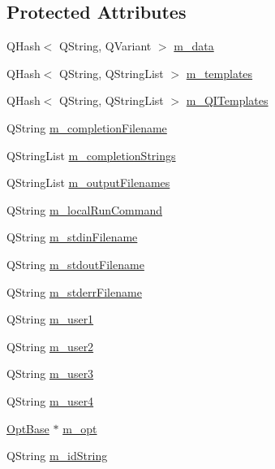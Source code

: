 \subsection*{Protected Attributes}
\begin{DoxyCompactItemize}
\item 
Q\-Hash$<$ Q\-String, Q\-Variant $>$ \hyperlink{classGlobalSearch_1_1Optimizer_a5cf732e34a6eaa4a7b1781d23e6e1c6e}{m\-\_\-data}
\item 
Q\-Hash$<$ Q\-String, Q\-String\-List $>$ \hyperlink{classGlobalSearch_1_1Optimizer_aa5892c64826b7cc7a2baa092efc8c66d}{m\-\_\-templates}
\item 
Q\-Hash$<$ Q\-String, Q\-String\-List $>$ \hyperlink{classGlobalSearch_1_1Optimizer_ac23d5114bf09b816666351868d49d1f8}{m\-\_\-\-Q\-I\-Templates}
\item 
Q\-String \hyperlink{classGlobalSearch_1_1Optimizer_a5e7a476823bc2d4b63939a9ada4f8ed0}{m\-\_\-completion\-Filename}
\item 
Q\-String\-List \hyperlink{classGlobalSearch_1_1Optimizer_a65ee33ee8778c366e8b197e75ae8e674}{m\-\_\-completion\-Strings}
\item 
Q\-String\-List \hyperlink{classGlobalSearch_1_1Optimizer_a28a8bf74bf7bdf00d453890796574c7d}{m\-\_\-output\-Filenames}
\item 
Q\-String \hyperlink{classGlobalSearch_1_1Optimizer_a1cdb6b6c5e929e84c834ba93148fb31e}{m\-\_\-local\-Run\-Command}
\item 
Q\-String \hyperlink{classGlobalSearch_1_1Optimizer_aca91d12d7aecae052d6ab5ae158acec6}{m\-\_\-stdin\-Filename}
\item 
Q\-String \hyperlink{classGlobalSearch_1_1Optimizer_a5ed04fdd5f8b511249e408adcd174550}{m\-\_\-stdout\-Filename}
\item 
Q\-String \hyperlink{classGlobalSearch_1_1Optimizer_a75b800a7f90a03d551f6795404d0c8f1}{m\-\_\-stderr\-Filename}
\item 
Q\-String \hyperlink{classGlobalSearch_1_1Optimizer_ae300aaecb74a7a61a501e4b8bd988957}{m\-\_\-user1}
\item 
Q\-String \hyperlink{classGlobalSearch_1_1Optimizer_a5ca1294d2a3aa119dfab655dfa270d3a}{m\-\_\-user2}
\item 
Q\-String \hyperlink{classGlobalSearch_1_1Optimizer_a279ca8ed61d6ca36f70c5c69b4d57397}{m\-\_\-user3}
\item 
Q\-String \hyperlink{classGlobalSearch_1_1Optimizer_aefab51b84978d2fb49eaf3585894808a}{m\-\_\-user4}
\item 
\hyperlink{classGlobalSearch_1_1OptBase}{Opt\-Base} $\ast$ \hyperlink{classGlobalSearch_1_1Optimizer_a689df6e2c0d8bbfff99585ca54199696}{m\-\_\-opt}
\item 
Q\-String \hyperlink{classGlobalSearch_1_1Optimizer_a4d2dc8b7aaa3bb6fed8c28547460def8}{m\-\_\-id\-String}
\end{DoxyCompactItemize}
